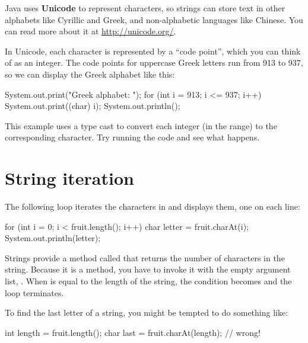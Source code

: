 
Java uses {\bf Unicode} to represent characters, so strings can store text in other alphabets like Cyrillic and Greek, and non-alphabetic languages like Chinese.
You can read more about it at \url{http://unicode.org/}.

In Unicode, each character is represented by a ``code point'', which you can think of as an integer.
The code points for uppercase Greek letters run from 913 to 937, so we can display the Greek alphabet like this:

\begin{code}
System.out.print("Greek alphabet: ");
for (int i = 913; i <= 937; i++) {
    System.out.print((char) i);
}
System.out.println();
\end{code}

This example uses a type cast to convert each integer (in the range) to the corresponding character.
Try running the code and see what happens.


\section{String iteration}


The following loop iterates the characters in  and displays them, one on each line:

\begin{code}
for (int i = 0; i < fruit.length(); i++) {
    char letter = fruit.charAt(i);
    System.out.println(letter);
}
\end{code}


Strings provide a method called  that returns the number of characters in the string.
Because it is a method, you have to invoke it with the empty argument list, \java{()}.
When  is equal to the length of the string, the condition becomes  and the loop terminates.

To find the last letter of a string, you might be tempted to do something like:

\begin{code}
int length = fruit.length();
char last = fruit.charAt(length);      // wrong!
\end{code}


